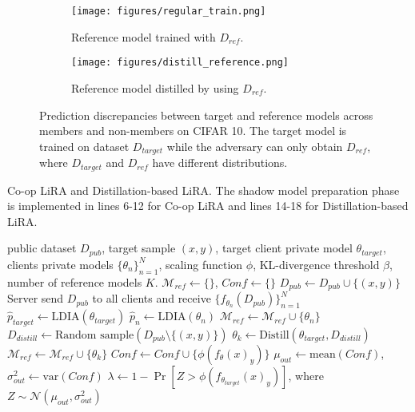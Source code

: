 \begin{figure}[h]
\centering
  \begin{subfigure}[m]{0.49\linewidth}
  \centering
    \texttt{[image: figures/regular\_train.png]}
    \caption{\centering Reference model trained with $D_{ref}$.}
    \label{fig:regular_reference_model}
  \end{subfigure}
  \hfill
  \begin{subfigure}[m]{0.49\linewidth}
  \centering
    \texttt{[image: figures/distill\_reference.png]}
    \caption{\centering Reference model distilled by using $D_{ref}$.}
    \label{fig:distilled_reference_model}
  \end{subfigure}
  \caption{Prediction discrepancies between target and reference models across members and non-members on CIFAR 10. The target model is trained on dataset $D_{target}$ while the adversary can only obtain $D_{ref}$, where $D_{target}$ and $D_{ref}$ have different distributions.}
  \label{fig:distlled_reference_model_comparison}
\end{figure}

\begin{algorithm}
\caption{Co-op LiRA and Distillation-based LiRA. The shadow model preparation phase is implemented in lines 6-12 for Co-op LiRA and lines 14-18 for Distillation-based LiRA.}
\label{alg:MIA_algorithm}
\begin{algorithmic}[1]
    \REQUIRE public dataset $D_{pub}$, target sample $(x,y)$, target client private model $\theta_{target}$, clients private models $\{\theta_n\}_{n=1}^N$, scaling function $\phi$, KL-divergence threshold $\beta$, number of reference models $K$.
    \STATE $\mathcal{M}_{ref} \leftarrow \{\}$, $Conf \leftarrow \{\}$
    \STATE $D_{pub} \leftarrow D_{pub} \cup \{(x,y)\}$ 
    \STATE Server send $D_{pub}$ to all clients and receive $\{f_{\theta_n}(D_{pub})\}_{n=1}^N$
    \STATE $\hat{p}_{target} \leftarrow \text{LDIA}(\theta_{target})$ 
        \STATE $\hat{p}_n \leftarrow \text{LDIA}(\theta_n)$
            \STATE $\mathcal{M}_{ref} \leftarrow \mathcal{M}_{ref} \cup \{\theta_n\}$
        \ENDIF
    \ENDFOR
    \STATE $D_{distill} \gets \text{Random sample}(D_{pub} \setminus \{(x,y)\})$ 
        \STATE $\theta_k \leftarrow \text{Distill} (\theta_{target}, D_{distill})$
        \STATE $\mathcal{M}_{ref} \leftarrow \mathcal{M}_{ref} \cup \{\theta_k\}$
    \ENDFOR
        \STATE $Conf \leftarrow Conf \cup \{\phi(f_{\theta}(x)_y)\}$
    \ENDFOR
    \STATE $\mu_{out} \leftarrow \text{mean}(Conf)$, $\sigma^{2}_{out} \leftarrow \text{var}(Conf)$
    \RETURN $\lambda \leftarrow 1 - \Pr[Z > \phi(f_{\theta_{target}}(x)_y)]$, where $Z \sim \mathcal{N}(\mu_{out}, \sigma^{2}_{out})$
\end{algorithmic}
\end{algorithm}

